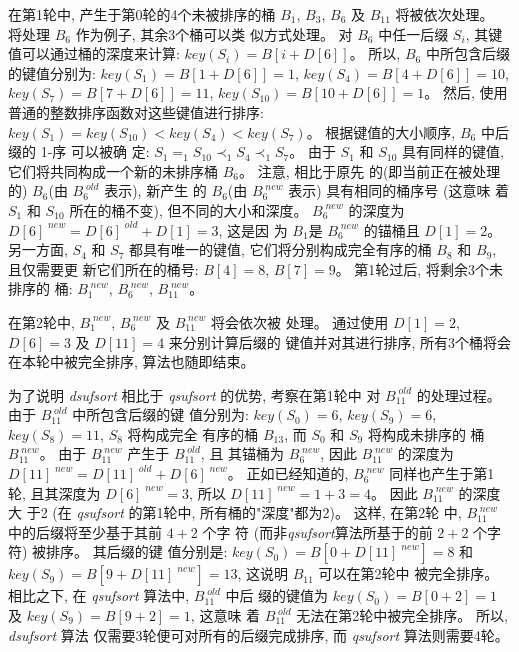 在第1轮中, 产生于第0轮的4个未被排序的桶 $B_1$, $B_3$,
$B_6$ 及 $B_{11}$ 将被依次处理。 将处理 $B_6$ 作为例子, 其余3个桶可以类
似方式处理。 对 $B_6$ 中任一后缀 $S_i$, 其键值可以通过桶的深度来计算:
$key(S_i) = B[i+D[6]]$。 所以, $B_6$ 中所包含后缀的键值分别为:
$key(S_1) = B[1+D[6]] = 1$, $key(S_4) = B[4+D[6]] = 10$,
$key(S_7) = B[7+D[6]] = 11$, $key(S_{10}) = B[10+D[6]] = 1$。 然后, 使用
普通的整数排序函数对这些键值进行排序: $key(S_1) = key(S_{10}) <
key(S_4) < key(S_7)$。  根据键值的大小顺序, $B_6$ 中后缀的 1-序 可以被确
定: $S_1 =_ 1 S_{10} \prec_1 S_4 \prec_1 S_7$。 由于 $S_1$ 和 $S_{10}$
具有同样的键值, 它们将共同构成一个新的未排序桶 $B_6$。 注意, 相比于原先
的(即当前正在被处理的) $B_6$(由 $B_6^{\;old}$ 表示), 新产生
的 $B_6$(由 $B_6^{\;new}$ 表示) 具有相同的桶序号 (这意味
着 $S_1$ 和 $S_{10}$ 所在的桶不变), 但不同的大小和深度。 $B_6^{\;new}$
的深度为 $D[6]^{\;new} = D[6]^{\;old} + D[1] = 3$, 这是因
为 $B_1$是 $B_6^{\;new}$ 的锚桶且 $D[1] = 2$。 另一方面, $S_4$ 和 $S_7$
都具有唯一的键值, 它们将分别构成完全有序的桶 $B_8$ 和 $B_9$, 且仅需要更
新它们所在的桶号: $B[4] = 8$, $B[7] = 9$。 第1轮过后, 将剩余3个未排序的
桶: $B_1^{\;new}$, $B_6^{\;new}$, $B_{11}^{\;new}$。

在第2轮中, $B_1^{\;new}$, $B_6^{\;new}$ 及 $B_{11}^{\;new}$ 将会依次被
处理。 通过使用 $D[1] = 2$, $D[6] = 3$ 及 $D[11] = 4$ 来分别计算后缀的
键值并对其进行排序, 所有3个桶将会在本轮中被完全排序, 算法也随即结束。

为了说明 \emph{dsufsort} 相比于 \emph{qsufsort} 的优势, 考察在第1轮中
对 $B_{11}^{\;old}$ 的处理过程。 由于 $B_{11}^{\;old}$ 中所包含后缀的键
值分别为: $key(S_0)=6$, $key(S_9)=6$, $key(S_8) = 11$, $S_8$ 将构成完全
有序的桶 $B_{13}$, 而 $S_0$ 和 $S_9$ 将构成未排序的
桶 $B_{11}^{\;new}$。 由于 $B_{11}^{\;new}$ 产生于 $B_{11}^{\;old}$, 且
其锚桶为 $B_6^{\;new}$, 因此 $B_{11}^{\;new}$ 的深度为
$D[11]^{\;new} = D[11]^{\;old} + D[6]^{\;new}$。 正如已经知道的,
$B_6^{\;new}$ 同样也产生于第1轮, 且其深度为 $D[6]^{\;new} =
3$, 所以 $D[11]^{\;new} = 1 + 3 = 4$。 因此 $B_{11}^{\;new}$ 的深度大
于2 (在 \emph{qsufsort} 的第1轮中, 所有桶的"深度"都为2)。 这样, 在第2轮
中, $B_{11}^{\;new}$ 中的后缀将至少基于其前 $4+2$ 个字
符 (而非\emph{qsufsort}算法所基于的前 $2+2$ 个字符) 被排序。 其后缀的键
值分别是: $key(S_0)=B[0+D[11] ^{\;new}]=
8$ 和 $key(S_9)=B[9+D[11]^{\;new}]= 13$, 这说明 $B_{11}$ 可以在第2轮中
被完全排序。 相比之下, 在 \emph{qsufsort} 算法中, $B_{11}^{\;old}$ 中后
缀的键值为 $key(S_0) = B[0+2] = 1$ 及 $key(S_9) = B[9+2] = 1$, 这意味
着 $B_{11}^{\;old}$ 无法在第2轮中被完全排序。 所以, \emph{dsufsort} 算法
仅需要3轮便可对所有的后缀完成排序, 而 \emph{qsufsort} 算法则需要4轮。


